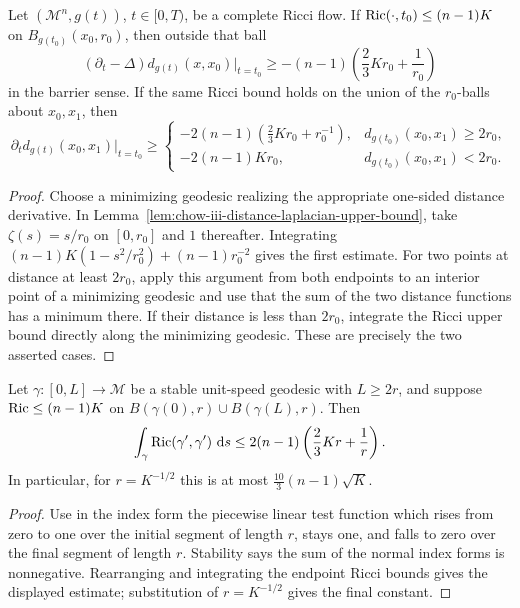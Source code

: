 \begin{theorem}
\label{thm:chow-iii-changing-distances}
Let \((\mathcal M^n,g(t))\), \(t\in[0,T)\), be a complete Ricci flow.
If \(\operatorname{Ric}(\cdot,t_0)\le(n-1)K\) on \(B_{g(t_0)}(x_0,r_0)\), then outside
that ball
\[
 (\partial_t-\Delta)d_{g(t)}(x,x_0)|_{t=t_0}
 \ge-(n-1)\left(\frac23Kr_0+\frac1{r_0}\right)
\]
in the barrier sense.  If the same Ricci bound holds on the union of the
\(r_0\)-balls about \(x_0,x_1\), then
\[
 \partial_td_{g(t)}(x_0,x_1)|_{t=t_0}\ge
 \begin{cases}
 -2(n-1)(\frac23Kr_0+r_0^{-1}),&d_{g(t_0)}(x_0,x_1)\ge2r_0,\\
 -2(n-1)Kr_0,&d_{g(t_0)}(x_0,x_1)<2r_0.
 \end{cases}
\]
\end{theorem}
\begin{proof}
Choose a minimizing geodesic realizing the appropriate one-sided distance
derivative.  In Lemma~\ref{lem:chow-iii-distance-laplacian-upper-bound}, take
\(\zeta(s)=s/r_0\) on \([0,r_0]\) and \(1\) thereafter.  Integrating
\((n-1)K(1-s^2/r_0^2)+(n-1)r_0^{-2}\) gives the first estimate.  For two
points at distance at least \(2r_0\), apply this argument from both endpoints
to an interior point of a minimizing geodesic and use that the sum of the two
distance functions has a minimum there.  If their distance is less than
\(2r_0\), integrate the Ricci upper bound directly along the minimizing
geodesic.  These are precisely the two asserted cases.
\end{proof}

\begin{proposition}
\label{prop:chow-iii-ricci-integral-stable-geodesic}
Let \(\gamma:[0,L]\to\mathcal M\) be a stable unit-speed geodesic with
\(L\ge2r\), and suppose
\(\operatorname{Ric}\le(n-1)K\) on \(B(\gamma(0),r)\cup B(\gamma(L),r)\).  Then
\[
 \int_\gamma\operatorname{Ric}(\gamma',\gamma')\,\,\mathrm{d} s
 \le2(n-1)\left(\frac23Kr+\frac1r\right).
\]
In particular, for \(r=K^{-1/2}\) this is at most
\(\frac{10}{3}(n-1)\sqrt K\).
\end{proposition}
\begin{proof}
Use in the index form the piecewise linear test function which rises from
zero to one over the initial segment of length \(r\), stays one, and falls to
zero over the final segment of length \(r\).  Stability says the sum of the
normal index forms is nonnegative.  Rearranging and integrating the endpoint
Ricci bounds gives the displayed estimate; substitution of \(r=K^{-1/2}\)
gives the final constant.
\end{proof}

